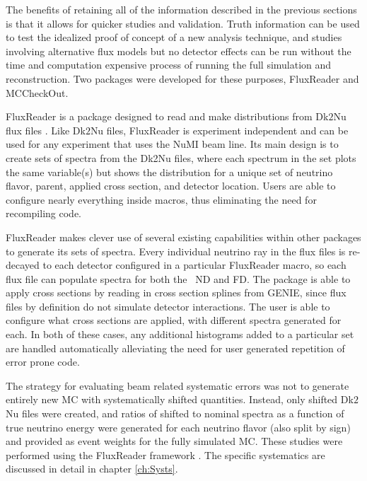 The benefits of retaining all of the information described in the previous sections is that it allows for quicker studies and validation. Truth information can be used to test the idealized proof of concept of a new analysis technique, and studies involving alternative flux models but no detector effects can be run without the time and computation expensive process of running the full simulation and reconstruction. Two packages were developed for these purposes, FluxReader and MCCheckOut.

FluxReader is a package designed to read and make distributions from Dk$2$Nu flux files \cite{ref:TNFR}. Like Dk$2$Nu files, FluxReader is experiment independent and can be used for any experiment that uses the NuMI beam line. Its main design is to create sets of spectra from the Dk2Nu files, where each spectrum in the set plots the same variable(s) but shows the distribution for a unique set of neutrino flavor, parent, applied cross section, and detector location. Users are able to configure nearly everything inside macros, thus eliminating the need for recompiling code.

FluxReader makes clever use of several existing capabilities within other packages to generate its sets of spectra. Every individual neutrino ray in the flux files is re-decayed to each detector configured in a particular FluxReader macro, so each flux file can populate spectra for both the \nova~ND and FD. The package is able to apply cross sections by reading in cross section splines from GENIE, since flux files by definition do not simulate detector interactions. The user is able to configure what cross sections are applied, with different spectra generated for each. In both of these cases, any additional histograms added to a particular set are handled automatically alleviating the need for user generated repetition of error prone code.

The strategy for evaluating beam related systematic errors was not to generate entirely new MC with systematically shifted quantities. Instead, only shifted Dk$2$Nu files were created, and ratios of shifted to nominal spectra as a function of true neutrino energy were generated for each neutrino flavor (also split by sign) and provided as event weights for the fully simulated MC. These studies were performed using the FluxReader framework \cite{ref:TNBeam}. The specific systematics are discussed in detail in chapter \ref{ch:Systs}.

